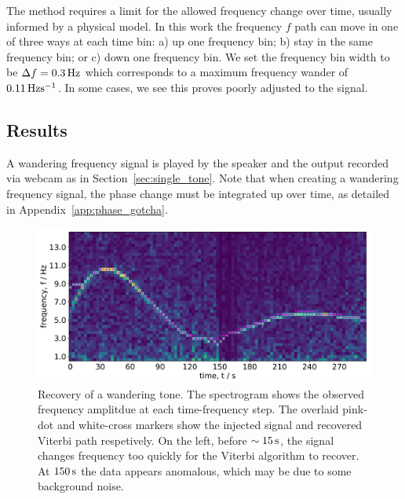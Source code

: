 \documentclass[paper-main.tex]{subfiles}
\begin{document}
The method requires a limit for the allowed frequency change over time, usually informed by a physical model. 
In this work the frequency $f$ path can move in one of three ways at each time bin: a) up one frequency bin; b) stay in the same frequency bin; or c) down one frequency bin. 
We set the frequency bin width to be $\Delta f = 0.3\,{\rm Hz}$ which corresponds to a maximum frequency wander of $0.11\,{\rm Hz}{\rm s}^{-1}$.
In some cases, we see this proves poorly adjusted to the signal. 


\subsection{Results}
\label{sec:wanderingResults}

A wandering frequency signal is played by the speaker and the output recorded via webcam as in Section~\ref{sec:single_tone}.
Note that when creating a wandering frequency signal, the phase change must be integrated up over time, as detailed in Appendix~\ref{app:phase_gotcha}.

\begin{figure}
	\includegraphics[width=\textwidth]{figures/expt_overlay_2_viterbi_test_webcam.pdf}
	\caption{\label{fig:viterbi_overlay}
Recovery of a wandering tone. 
The spectrogram shows the observed frequency amplitdue at each time-frequency step. 
The overlaid pink-dot and white-cross markers show the injected signal and recovered Viterbi path respetively. 
On the left, before $\sim 15\,{\rm s}$, the signal changes frequency too quickly for the Viterbi algorithm to recover. 
At $150\,{\rm s}$ the data appears anomalous, which may be due to some background noise. }
\end{figure}
\end{document}

